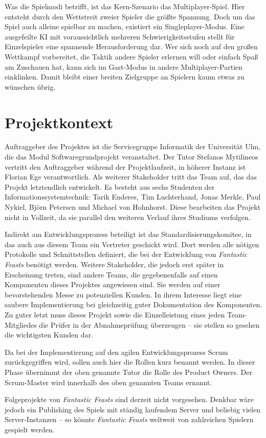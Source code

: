 Was die Spielmodi betrifft, ist das Kern-Szenario das Multiplayer-Spiel. Hier entsteht durch den Wettstreit zweier Spieler die größte Spannung. Doch um das Spiel auch alleine spielbar zu machen, existiert ein Singleplayer-Modus. Eine ausgefeilte KI mit voraussichtlich mehreren Schwierigkeitsstufen stellt für Einzelspieler eine spannende Herausforderung dar. Wer sich noch auf den großen Wettkampf vorbereitet, die Taktik andere Spieler erlernen will oder einfach Spaß am Zuschauen hat, kann sich im Gast-Modus in andere Multiplayer-Partien einklinken. Damit bleibt einer breiten Zielgruppe an Spielern kaum etwas zu wünschen übrig.

\section{Projektkontext}
Auftraggeber des Projektes ist die Servicegruppe Informatik der Universität Ulm, die das Modul Softwaregrundprojekt veranstaltet. Der Tutor Stefanos Mytilineos vertritt den Auftraggeber während der Projektlaufzeit, in höherer Instanz ist Florian Ege verantwortlich. Als weiterer Stakeholder tritt das Team auf, das das Projekt letztendlich entwickelt. Es besteht aus sechs Studenten der Informationssystemtechnik: Tarik Enderes, Tim Luchterhand, Jonas Merkle, Paul Nykiel, Björn Petersen und Michael von Hohnhorst. Diese bearbeiten das Projekt nicht in Vollzeit, da sie parallel den weiteren Verlauf ihres Studiums verfolgen. 

Indirekt am Entwicklungsprozess beteiligt ist das Standardisierungskomitee, in das auch aus diesem Team ein Vertreter geschickt wird. Dort werden alle nötigen Protokolle und Schnittstellen definiert, die bei der Entwicklung von \textit{Fantastic Feasts} benötigt werden. Weitere Stakeholder, die jedoch erst später in Erscheinung treten, sind andere Teams, die gegebenenfalls auf einen Komponenten dieses Projektes angewiesen sind. Sie werden auf einer bevorstehenden Messe zu potenziellen Kunden. In ihrem Interesse liegt eine saubere Implementierung bei gleichzeitig guter Dokumentation des Komponenten. Zu guter letzt muss dieses Projekt sowie die Einzelleistung eines jeden Team-Mitgliedes die Prüfer in der Abnahmeprüfung überzeugen – sie stellen so gesehen die wichtigsten Kunden dar.

Da bei der Implementierung auf den agilen Entwicklungsprozess Scrum zurückgegriffen wird, sollen auch hier die Rollen kurz benannt werden. In dieser Phase übernimmt der oben genannte Tutor die Rolle des Product Owners. Der Scrum-Master wird innerhalb des oben genannten Teams ernannt.

Folgeprojekte von \textit{Fantastic Feasts} sind derzeit nicht vorgesehen. Denkbar wäre jedoch ein Publishing des Spiels mit ständig laufendem Server und beliebig vielen Server-Instanzen – so könnte \textit{Fantastic Feasts} weltweit von zahlreichen Spielern gespielt werden.
